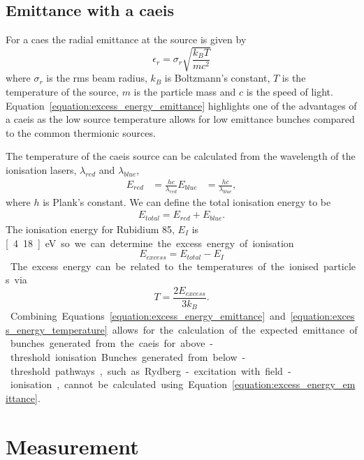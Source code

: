 \subsection{Emittance with a \gls{caeis}}
\label{section:excess_energy_emittance}

For a \gls{caes} the radial emittance at the source is given by~\cite{mcculloch_high-coherence_2013}
\begin{equation}\label{equation:excess_energy_emittance}
\epsilon_r = \sigma_r \sqrt{\frac{k_B T}{m c^2}}
\end{equation}
where $\sigma_r$ is the \gls{rms} beam radius, $k_B$ is Boltzmann's constant, $T$ is the temperature of the source, $m$ is the particle mass and $c$ is the speed of light.
Equation~\ref{equation:excess_energy_emittance} highlights one of the advantages of a \gls{caeis} as the low source temperature allows for low emittance bunches compared to the common thermionic sources.

The temperature of the \gls{caeis} source can be calculated from the wavelength of the ionisation lasers, $\lambda_{red}$ and $\lambda_{blue}$,
\begin{align}
 E_{red} &= \frac{hc}{\lambda_{red}} E_{blue} &= \frac{hc}{\lambda_{blue}},
\end{align}
where $h$ is Plank's constant.
We can define the total ionisation energy to be
\begin{align}
E_{total} = E_{red} + E_{blue}.
\end{align}
The ionisation energy for Rubidium 85, $E_I$ is \unit[4.18]{eV} so we can determine the excess energy of ionisation
\begin{equation}
E_{excess} = E_{total} - E_I
\end{equation}

The excess energy can be related to the temperatures of the ionised particles via
\begin{equation}\label{equation:excess_energy_temperature}
T = \frac{2 E_{excess}}{3 k_B}.
\end{equation}
Combining Equations \ref{equation:excess_energy_emittance} and \ref{equation:excess_energy_temperature} allows for the calculation of the expected emittance of bunches generated from the \gls{caeis} for above-threshold ionisation.
Bunches generated from below-threshold pathways, such as Rydberg-excitation with field-ionisation, cannot be calculated using Equation~\ref{equation:excess_energy_emittance}.

\section{Measurement}

